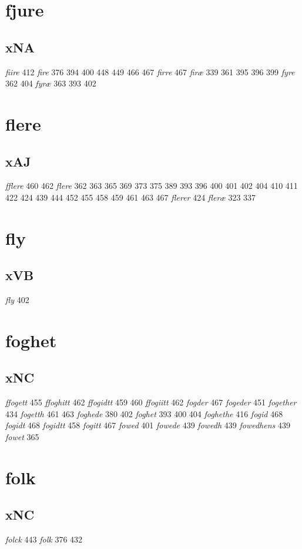 \documentclass[a4paper,twocolumn]{article}
\begin{document}
\section{fjure}
\label{sec:orgff3e89b}
\subsection{xNA}
\label{sec:org0a78e22}
\emph{fiire} 412 \emph{fire} 376 394 400 448 449 466 467 \emph{firre} 467 \emph{firæ} 339 361 395 396 399 \emph{fyre} 362 404 \emph{fyræ} 363 393 402 
\section{flere}
\label{sec:org6046f96}
\subsection{xAJ}
\label{sec:org7f1e32f}
\emph{fflere} 460 462 \emph{flere} 362 363 365 369 373 375 389 393 396 400 401 402 404 410 411 422 424 439 444 452 455 458 459 461 463 467 \emph{flerer} 424 \emph{fleræ} 323 337 
\section{fly}
\label{sec:org3919fc2}
\subsection{xVB}
\label{sec:org9c3a61d}
\emph{fly} 402 
\section{foghet}
\label{sec:orgfa03210}
\subsection{xNC}
\label{sec:org4f76ac9}
\emph{ffogett} 455 \emph{ffoghitt} 462 \emph{ffogidtt} 459 460 \emph{ffogiitt} 462 \emph{fogder} 467 \emph{fogeder} 451 \emph{fogether} 434 \emph{fogetth} 461 463 \emph{foghede} 380 402 \emph{foghet} 393 400 404 \emph{foghethe} 416 \emph{fogid} 468 \emph{fogidt} 468 \emph{fogidtt} 458 \emph{fogitt} 467 \emph{fowed} 401 \emph{fowede} 439 \emph{fowedh} 439 \emph{fowedhens} 439 \emph{fowet} 365 
\section{folk}
\label{sec:org10b7f4a}
\subsection{xNC}
\label{sec:org87bdc5e}
\emph{folck} 443 \emph{folk} 376 432 
\end{document}
